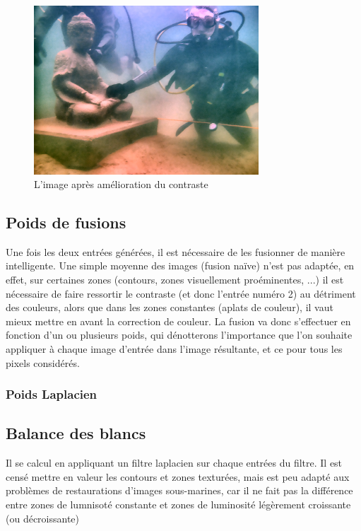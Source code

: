 \documentclass[twoside]{article}
\begin{document}
\begin{figure}[]
  \centering
  \includegraphics[width=0.75\textwidth]{Support/contrast.png}
  \caption{L'image après amélioration du contraste}
\end{figure}

\subsection{Poids de fusions}
Une fois les deux entrées générées, il est nécessaire de les fusionner de manière intelligente. Une simple moyenne des images (fusion naïve) n'est pas adaptée, en effet, sur certaines zones (contours, zones visuellement proéminentes, ...) il est nécessaire de faire ressortir le contraste (et donc l'entrée numéro 2) au détriment des couleurs, alors que dans les zones constantes (aplats de couleur), il vaut mieux mettre en avant la correction de couleur. La fusion va donc s'effectuer en fonction d'un ou plusieurs poids, qui dénotterons l'importance que l'on souhaite appliquer à chaque image d'entrée dans l'image résultante, et ce pour tous les pixels considérés. 

\subsubsection{Poids Laplacien}
\subsection{Balance des blancs}


Il se calcul en appliquant un filtre laplacien sur chaque entrées du filtre. Il est censé mettre en valeur les contours et zones texturées, mais est peu adapté aux problèmes de restaurations d'images sous-marines, car il ne fait pas la différence entre zones de lumnisoté constante et zones de luminosité légèrement croissante (ou décroissante)
\end{document}
